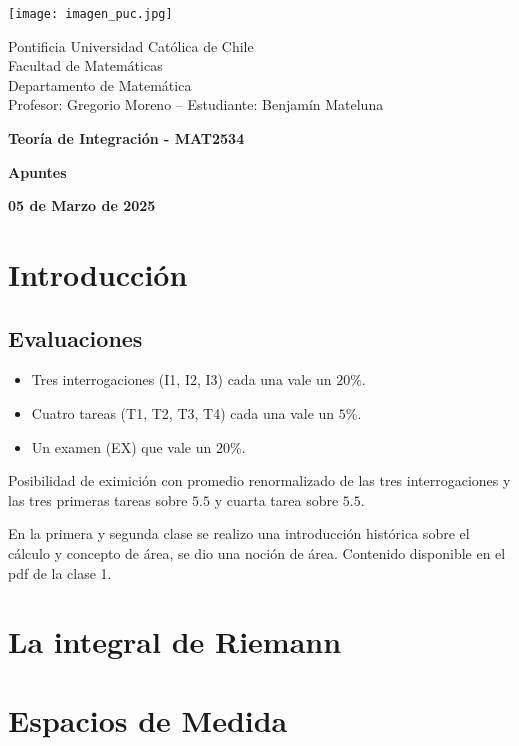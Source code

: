 \documentclass{article}
\begin{document}
\begin{minipage}{2.5cm}
    \texttt{[image: imagen\_puc.jpg]}
\end{minipage}
\begin{minipage}{14cm}
    {\sc Pontificia Universidad Católica de Chile\\
    Facultad de Matemáticas\\
    Departamento de Matemática\\
    Profesor: Gregorio Moreno -- Estudiante: Benjamín Mateluna}
\end{minipage}
\vspace{1ex}

{\centerline{\bf Teoría de Integración - MAT2534}
\centerline{\bf Apuntes}}
\centerline{\bf 05 de Marzo de 2025}

\newpage
\tableofcontents

\newpage
\section{Introducción}
\subsection{Evaluaciones}
\begin{itemize}
    \item Tres interrogaciones (I1, I2, I3) cada una vale un $20\%$.
    \item Cuatro tareas (T1, T2, T3, T4) cada una vale un $5\%$.
    \item Un examen (EX) que vale un $20\%$.
\end{itemize}
Posibilidad de eximición con promedio renormalizado de las tres interrogaciones y las tres 
primeras tareas sobre $5.5$ y cuarta tarea sobre $5.5$.
\vspace{4mm}

\noindent En la primera y segunda clase se realizo una introducción histórica sobre el cálculo y 
concepto de área, se dio una noción de área. Contenido disponible en el pdf de la clase 1. 

\newpage
\section{La integral de Riemann}

\newpage
\section{Espacios de Medida}
\end{document}
